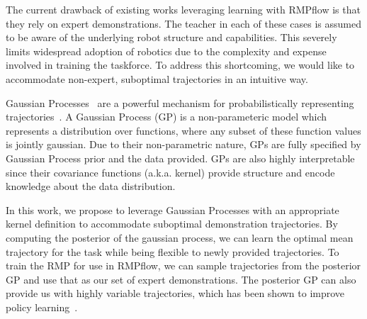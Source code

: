 The current drawback of existing works leveraging learning with RMPflow is that they rely on expert demonstrations. The teacher in each of these cases is assumed to be aware of the underlying robot structure and capabilities. This severely limits widespread adoption of robotics due to the complexity and expense involved in training the taskforce. To address this shortcoming, we would like to accommodate non-expert, suboptimal trajectories in an intuitive way.

Gaussian Processes~\cite{Rasmussen04book} are a powerful mechanism for probabilistically representing trajectories~\cite{vanWaveren22manuscript}. A Gaussian Process (GP) is a non-parameteric model which represents a distribution over functions, where any subset of these function values is jointly gaussian. Due to their non-parametric nature, GPs are fully specified by Gaussian Process prior and the data provided. GPs are also highly interpretable since their covariance functions (a.k.a. kernel) provide structure and encode knowledge about the data distribution.

In this work, we propose to leverage Gaussian Processes with an appropriate kernel definition to accommodate suboptimal demonstration trajectories. By computing the posterior of the gaussian process, we can learn the optimal mean trajectory for the task while being flexible to newly provided trajectories.
To train the RMP for use in RMPflow, we can sample trajectories from the posterior GP and use that as our set of expert demonstrations. The posterior GP can also provide us with highly variable trajectories, which has been shown to improve policy learning~\cite{Duan17neurips}.




